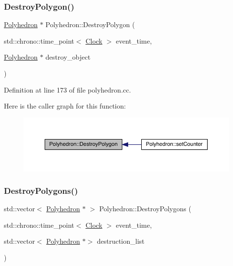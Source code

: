\subsubsection{\texorpdfstring{Destroy\+Polygon()}{DestroyPolygon()}}
{\footnotesize\ttfamily \hyperlink{class_polyhedron}{Polyhedron} $\ast$ Polyhedron\+::\+Destroy\+Polygon (\begin{DoxyParamCaption}\item[{std\+::chrono\+::time\+\_\+point$<$ \hyperlink{universe_8h_a0ef8d951d1ca5ab3cfaf7ab4c7a6fd80}{Clock} $>$}]{event\+\_\+time,  }\item[{\hyperlink{class_polyhedron}{Polyhedron} $\ast$}]{destroy\+\_\+object }\end{DoxyParamCaption})}



Definition at line 173 of file polyhedron.\+cc.

Here is the caller graph for this function\+:
\nopagebreak
\begin{figure}[H]
\begin{center}
\leavevmode
\includegraphics[width=350pt]{class_polyhedron_a2fcc5144ebc64363f40c31d2b980cfaf_icgraph}
\end{center}
\end{figure}
\mbox{\label{class_polyhedron_ae372d216765d48b9423ee37a8bf8b282}} 
\subsubsection{\texorpdfstring{Destroy\+Polygons()}{DestroyPolygons()}}
{\footnotesize\ttfamily std\+::vector$<$ \hyperlink{class_polyhedron}{Polyhedron} $\ast$ $>$ Polyhedron\+::\+Destroy\+Polygons (\begin{DoxyParamCaption}\item[{std\+::chrono\+::time\+\_\+point$<$ \hyperlink{universe_8h_a0ef8d951d1ca5ab3cfaf7ab4c7a6fd80}{Clock} $>$}]{event\+\_\+time,  }\item[{std\+::vector$<$ \hyperlink{class_polyhedron}{Polyhedron} $\ast$$>$}]{destruction\+\_\+list }\end{DoxyParamCaption})}



